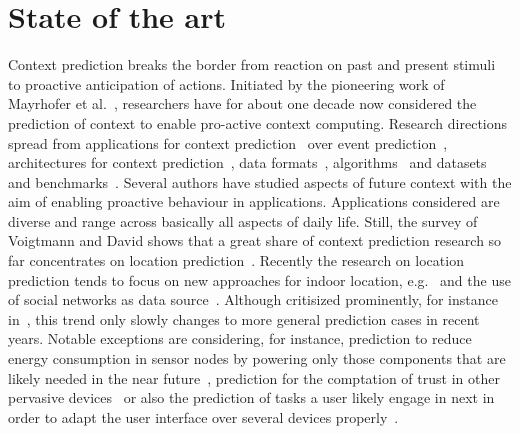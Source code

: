 \section{State of the art}
\label{sec:stateOfTheArt}

Context prediction breaks the border from reaction on past and present stimuli to proactive anticipation of actions. 
Initiated by the pioneering work of Mayrhofer et al.~\cite{5013}, researchers have for about one decade now considered the prediction of context to enable pro-active context computing. 
Research directions spread from applications for context prediction~\cite{5035} over event prediction~\cite{5071}, architectures for context prediction~\cite{5001,5010,4027}, data formats~\cite{Prediction_Bannach_2010}, algorithms~\cite{Prediction_Intille_2006} and datasets and benchmarks~\cite{Prediction_Kasteren_2008}. 
Several authors have studied aspects of future context with the aim of enabling proactive behaviour in applications. 
Applications considered are diverse and range across basically all aspects of daily life. 
Still, the survey of Voigtmann and David shows that a great share of context prediction research so far concentrates on location prediction~\cite{Prediction_Voigtmann_2012}. 
Recently the research on location prediction tends to focus on new approaches for indoor location, e.g.~\cite{Prediction_Ruscher_2012,Prediction_Murao_2012,Prediction_Alvarez_2013,Prediction_Eldaw_2013} and the use of social networks as data source~\cite{Prediction_Zhang_2012}. 
Although critisized prominently, for instance in~\cite{5088}, this trend only slowly changes to more general prediction cases in recent years.
Notable exceptions are considering, for instance, prediction to reduce energy consumption in sensor nodes by powering only those components that are likely needed in the near future~\cite{ContextAwareness_Gordon_2011}, prediction for the comptation of trust in other pervasive devices~\cite{2040} or also the prediction of tasks a user likely engage in next in order to adapt the user interface over several devices properly~\cite{5019}.
